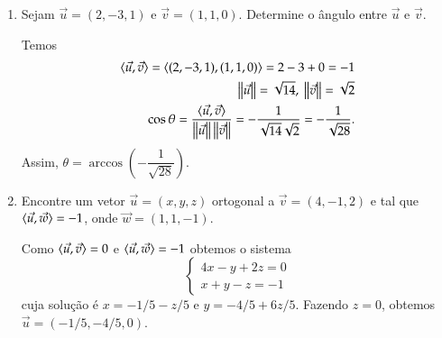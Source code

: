 \begin{exemplos}
  \begin{enumerate}
    \item Sejam $\vec{u} = (2, -3, 1)$ e $\vec{v} = (1,1, 0)$. Determine o \^angulo entre $\vec{u}$ e $\vec{v}$.
    \begin{solucao}
      Temos
      \begin{align*}
        \langle \vec{u}, \vec{v} \rangle = \langle(2, -3, 1), (1,1,0)\rangle = 2 - 3 + 0 = -1\\
        \left\Vert{\vec{u}}\right\Vert = \sqrt{14},\ \left\Vert{\vec{v}}\right\Vert = \sqrt{2}\\
        \cos\theta = \frac{\langle \vec{u}, \vec{v} \rangle}{\left\Vert{\vec{u}}\right\Vert\left\Vert{\vec{v}}\right\Vert} = -\dfrac{1}{\sqrt{14}\sqrt{2}} = -\dfrac{1}{\sqrt{28}}.
      \end{align*}
      Assim, $\theta = \arccos\left(-\dfrac{1}{\sqrt{28}}\right)$.
    \end{solucao}
    \item Encontre um vetor $\vec{u} = (x, y, z)$ ortogonal a $\vec{v} = (4, -1, 2)$ e tal que $\langle \vec{u}, \vec{w} \rangle = -1$, onde $\vec{w} = (1,1,-1)$.
    \begin{solucao}
      Como $\langle \vec{u}, \vec{v} \rangle = 0$ e $\langle \vec{u}, \vec{w} \rangle = -1$ obtemos o sistema
      \[
        \begin{cases}
          4x - y + 2z = 0\\
          x + y - z = -1
        \end{cases}
      \]
      cuja solu\c{c}\~ao \'e $x = -1/5 - z/5$ e $y = -4/5 + 6z/5$. Fazendo $z = 0$, obtemos $\vec{u} = (-1/5, -4/5, 0)$.
    \end{solucao}
  \end{enumerate}
\end{exemplos}

